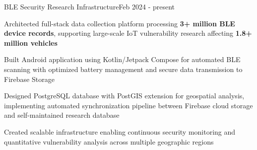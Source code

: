 \begin{joblong}{BLE Security Research Infrastructure}{Feb 2024 - present}
	\item Architected full-stack data collection platform processing \textbf{3+ million BLE device records}, supporting large-scale IoT vulnerability research affecting \textbf{1.8+ million vehicles}
	\item Built Android application using Kotlin/Jetpack Compose for automated BLE scanning with optimized battery management and secure data transmission to Firebase Storage
	\item Designed PostgreSQL database with PostGIS extension for geospatial analysis, implementing automated synchronization pipeline between Firebase cloud storage and self-maintained research database
	\item Created scalable infrastructure enabling continuous security monitoring and quantitative vulnerability analysis across multiple geographic regions
\end{joblong}
